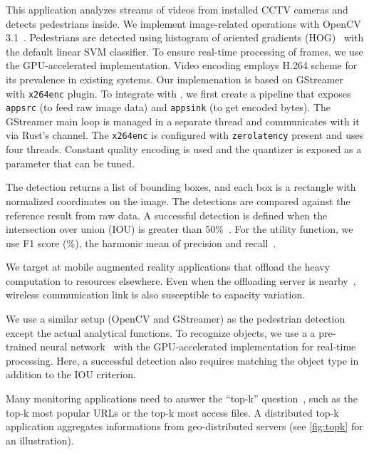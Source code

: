  This application analyzes streams of videos from
installed CCTV cameras and detects pedestrians inside. We implement
image-related operations with OpenCV 3.1~\cite{opencvlibrary}. Pedestrians are
detected using histogram of oriented gradients (HOG)~\cite{dalal2005histograms}
with the default linear SVM classifier. To ensure real-time processing of
frames, we use the GPU-accelerated implementation. Video encoding employs H.264
scheme for its prevalence in existing systems. Our implemenation is based on
GStreamer~\cite{gstreamer} with \texttt{x264enc} plugin. To integrate with
\sysname{}, we first create a pipeline that exposes \texttt{appsrc} (to feed raw
image data) and \texttt{appsink} (to get encoded bytes). The GStreamer main loop
is managed in a separate thread and \sysname{} communicates with it via Rust's
channel. The \texttt{x264enc} is configured with \texttt{zerolatency} present
and uses four threads. Constant quality encoding is used and the quantizer is
exposed as a parameter that can be tuned.

The detection returns a list of bounding boxes, and each box is a rectangle with
normalized coordinates on the image. The detections are compared against the
reference result from raw data. A successful detection is defined when the
intersection over union (IOU) is greater than
50\%~\cite{everingham2010pascal}. For the utility function, we use F1 score
(\%), the harmonic mean of precision and
recall~\cite{Rijsbergen:1979:IR:539927}.

 We target at mobile augmented reality applications
that offload the heavy computation to resources elsewhere. Even when the
offloading server is nearby~\cite{satyanarayanan2009case, zhang2015cloud},
wireless communication link is also susceptible to capacity variation.

We use a similar setup (OpenCV and GStreamer) as the pedestrian detection except
the actual analytical functions. To recognize objects, we use a a pre-trained
neural network~\cite{darknet13, redmon2016yolo9000} with the GPU-accelerated
implementation for real-time processing. Here, a successful detection also
requires matching the object type in addition to the IOU criterion.

 Many monitoring applications need to answer the
``top-k'' question~\cite{babcock2003distributed}, such as the top-k most popular
URLs or the top-k most access files. A distributed top-k application aggregates
informations from geo-distributed servers (see \autoref{fig:topk} for an
illustration).

